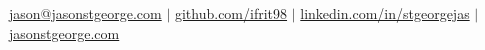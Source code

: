 \documentclass[10.5pt]{res}
\begin{document}
 
{\fontsize{10.5}{6}\selectfont
\centering 
\href{mailto:jason@jasonstgeorge.com}{jason@jasonstgeorge.com} \hspace{.15 cm} $\vert$ \hspace{.15 cm} \href{https://github.com/ifrit98}{github.com/ifrit98} \hspace{.15 cm} $\vert$ \hspace{.15 cm} \href{https://linkedin.com/in/stgeorgejas}{linkedin.com/in/stgeorgejas} \hspace{.15 cm} $\vert$ \hspace{.15 cm} \href{https://jasonstgeorge.com}{jasonstgeorge.com}\\


\hrulefill
}
\vspace{0.25cm}
\end{document}
